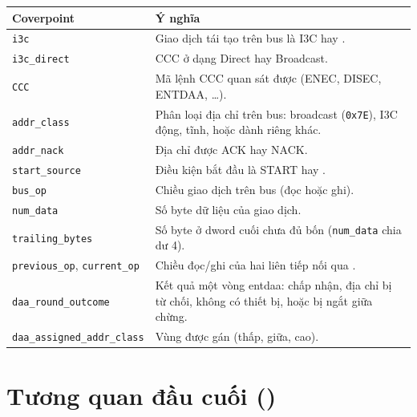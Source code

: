 \begin{longtable}{L{4.2cm} L{8.4cm}}
  \toprule
  \textbf{Coverpoint} & \textbf{Ý nghĩa} \\
  \midrule
  \endhead
  \texttt{i3c}                     & Giao dịch tái tạo trên bus là I3C hay \iic{}. \\
  \texttt{i3c\_direct}             & CCC ở dạng Direct hay Broadcast. \\
  \texttt{CCC}                     & Mã lệnh CCC quan sát được (ENEC, DISEC, ENTDAA, \ldots). \\
  \texttt{addr\_class}             & Phân loại địa chỉ trên bus: broadcast (\texttt{0x7E}), I3C động, \iic{} tĩnh, hoặc dành riêng khác. \\
  \texttt{addr\_nack}              & Địa chỉ được ACK hay NACK. \\
  \texttt{start\_source}           & Điều kiện bắt đầu là START hay \RepeatedSTART{}. \\
  \texttt{bus\_op}                 & Chiều giao dịch trên bus (đọc hoặc ghi). \\
  \texttt{num\_data}               & Số byte dữ liệu của giao dịch. \\
  \texttt{trailing\_bytes}         & Số byte ở \gls{dword} cuối chưa đủ bốn (\texttt{num\_data} chia dư 4). \\
  \texttt{previous\_op}, \texttt{current\_op} & Chiều đọc/ghi của hai \PrivateTransfer{} liên tiếp nối qua \RepeatedSTART{}. \\
  \texttt{daa\_round\_outcome}     & Kết quả một vòng \gls{entdaa}: chấp nhận, địa chỉ bị từ chối, không có thiết bị, hoặc bị ngắt giữa chừng. \\
  \texttt{daa\_assigned\_addr\_class} & Vùng \DynamicAddress{} được gán (thấp, giữa, cao). \\
  \bottomrule
\end{longtable}

\section*{Tương quan đầu cuối (\CorrelatedCoverage{})}

